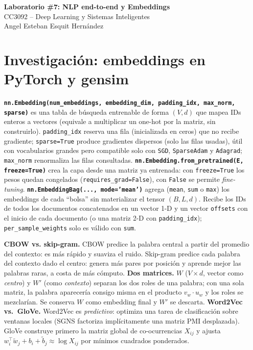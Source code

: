 \documentclass[10pt,a4paper]{article}
\begin{document}
\pagestyle{plain}

\begin{center}
{\LARGE\bfseries Laboratorio \#7: NLP end-to-end y Embeddings}\\[5pt]
{\large CC3092 -- Deep Learning y Sistemas Inteligentes}\\[5pt]
{\normalsize Angel Esteban Esquit Hernández}
\end{center}
\vspace{2pt}

\section{Investigación: embeddings en PyTorch y gensim}
\textbf{\texttt{nn.Embedding(num\_embeddings, embedding\_dim, padding\_idx, max\_norm, sparse)}} es una tabla de búsqueda entrenable de forma $(V,d)$ que mapea IDs enteros a vectores (equivale a multiplicar un one-hot por la matriz, sin construirlo). \texttt{padding\_idx} reserva una fila (inicializada en ceros) que no recibe gradiente; \texttt{sparse=True} produce gradientes dispersos (solo las filas usadas), útil con vocabularios grandes pero compatible solo con \texttt{SGD}, \texttt{SparseAdam} y \texttt{Adagrad}; \texttt{max\_norm} renormaliza las filas consultadas. \textbf{\texttt{nn.Embedding.from\_pretrained(E, freeze=True)}} crea la capa desde una matriz ya entrenada: con \texttt{freeze=True} los pesos quedan congelados (\texttt{requires\_grad=False}), con \texttt{False} se permite \textit{fine-tuning}.
\textbf{\texttt{nn.EmbeddingBag(..., mode='mean')}} agrega (\texttt{mean}, \texttt{sum} o \texttt{max}) los embeddings de cada ``bolsa'' sin materializar el tensor $(B,L,d)$. Recibe los IDs de todos los documentos concatenados en un vector 1-D y un vector \texttt{offsets} con el inicio de cada documento (o una matriz 2-D con \texttt{padding\_idx}); \texttt{per\_sample\_weights} solo es válido con \texttt{sum}.

\textbf{CBOW vs. skip-gram.} CBOW predice la palabra central a partir del promedio del contexto: es más rápido y suaviza el ruido. Skip-gram predice cada palabra del contexto dado el centro: genera más pares por posición y aprende mejor las palabras raras, a costa de más cómputo. \textbf{Dos matrices.} $W$ ($V\times d$, vector como \textit{centro}) y $W'$ (como \textit{contexto}) separan los dos roles de una palabra; con una sola matriz, la palabra aparecería consigo misma en el producto $v_w\!\cdot\!u_w$ y los roles se mezclarían. Se conserva $W$ como embedding final y $W'$ se descarta. \textbf{Word2Vec vs.\ GloVe.} Word2Vec es \textit{predictivo}: optimiza una tarea de clasificación sobre ventanas locales (SGNS factoriza implícitamente una matriz PMI desplazada). GloVe construye primero la matriz global de co-ocurrencias $X_{ij}$ y ajusta $w_i^\top\tilde w_j+b_i+\tilde b_j\approx\log X_{ij}$ por mínimos cuadrados ponderados.
\end{document}
